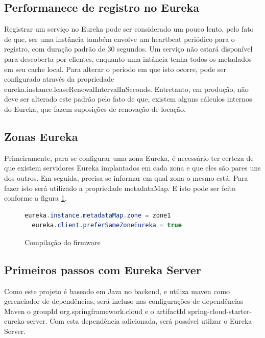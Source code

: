 \documentclass[journal]{IEEEtran}
\begin{document}
\subsection{Performanece de registro no Eureka}

Registrar um serviço no Eureka pode ser considerado um pouco lento, pelo fato de que, ser uma instância também envolve um heartbeat periódico para o registro, com duração padrão de 30 segundos. Um serviço não estará disponível para descoberta por clientes, enquanto uma intância tenha todos os metadados em seu cache local. Para alterar o período em que isto ocorre, pode ser configurado através da propriedade eureka.instance.leaseRenewalIntervalInSeconds. Entretanto, em produção, não deve ser alterado este padrão pelo fato de que, existem alguns cálculos internos do Eureka, que fazem suposições de renovação de locação.

\subsection{Zonas Eureka}

Primeiramente, para se configurar uma zona Eureka, é necessário ter certeza de que existem servidores Eureka implantados em cada zona e que eles são pares uns dos outros. Em seguida, precisa-se informar em qual zona o mesmo está. Para fazer isto será utilizado a propriedade metadataMap. E isto pode ser feito conforme a figura \ref{alg:figuraseis}.

\begin{figure}[h]
\centering

\begin{lstlisting}[language=Java]
  eureka.instance.metadataMap.zone = zone1
  eureka.client.preferSameZoneEureka = true
\end{lstlisting}

\caption{Compilação do firmware}
\label{alg:figuraseis}
\end{figure}

\subsection{Primeiros passos com Eureka Server}

Como este projeto é baseado em Java no backend, e utiliza maven como gerenciador de dependências, será incluso nas configurações de dependências Maven o groupId org.springframework.cloud e o artifactId spring-cloud-starter-eureka-server. Com esta dependência adicionada, será possível utilzar o Eureka Server.
\end{document}
